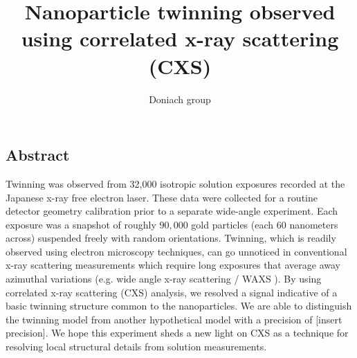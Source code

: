 \documentclass [11pt,fleqn]{article}
\title{Nanoparticle twinning observed using  correlated x-ray scattering (CXS)}
\author{Doniach group}
\date{}
\begin{document}
 
\maketitle

\delimitershortfall=-1pt

\begin{center}
\section*{Abstract}
\end{center}
Twinning was observed from 32,000 isotropic solution exposures recorded at the Japanese x-ray free electron laser. These data were collected for a routine detector geometry calibration prior to a separate wide-angle experiment. Each exposure was a snapshot of roughly $90,000$ gold particles (each 60 nanometers across) suspended freely with random orientations. Twinning, which is readily observed using electron microscopy techniques, can go unnoticed in conventional x-ray scattering measurements which require long exposures that average away azimuthal variations (e.g. wide angle x-ray scattering / WAXS ). By using correlated x-ray scattering (CXS) analysis, we resolved a signal indicative of a basic twinning structure common to the nanoparticles. We are able to distinguish the twinning model from another hypothetical model with a precision of [insert precision]. We hope this experiment sheds a new light on CXS as a technique for resolving local structural details from solution measurements.
\end{document}
